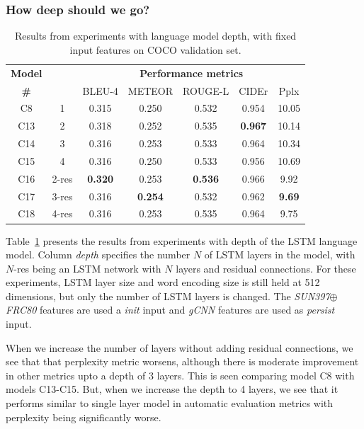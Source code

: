 \subsubsection{How deep should we go?}
\begin{table}[htp]
  \centering
  \newcommand{\bs}{\small}
  \begin{adjustbox}{center}
  \begin{tabular}{|c|c|c|c|c|c|c|}
    \hline
    \bf Model & \bf \multirow{2}{*}{Depth} & \multicolumn{5}{c|}{\bf Performance metrics}\\
    \cline{3-7}
    \bf \# &\bf &\bs BLEU-4 &\bs METEOR &\bs ROUGE-L &\bs CIDEr&\bs Pplx \\\hline
    C8  & 1   & 0.315 & 0.250 & 0.532 & 0.954 &10.05  \\\hline
    C13 & 2   & 0.318 & 0.252 & 0.535 &\bf0.967 & 10.14  \\
    C14 & 3   & 0.316 & 0.253 & 0.533 & 0.964   & 10.34  \\
    C15 & 4   & 0.316 & 0.250 & 0.533 & 0.956 & 10.69  \\\hline
    C16 &2-res&\bf0.320& 0.253 &\bf0.536&0.966  & 9.92   \\
    C17 &3-res& 0.316 &\bf0.254&0.532 & 0.962   &\bf9.69 \\
    C18 &4-res& 0.316 & 0.253 & 0.535 & 0.964   & 9.75 \\\hline
  \end{tabular}
  \end{adjustbox}
  \caption{Results from experiments with language model depth, with fixed input features on COCO validation set.}
  \label{tab:resCocDepthExpt}
\end{table}

Table~\ref{tab:resCocDepthExpt} presents the results from experiments with depth
of the LSTM language model.
Column \emph{depth} specifies the number $N$ of LSTM layers in the model,
with $N$-res being an LSTM network with $N$ layers and residual connections.
For these experiments, LSTM layer size and word encoding size is still held at
512 dimensions, but only the number of LSTM layers is changed.
The \emph{SUN397$\oplus$FRC80} features are used a \emph{init} input and
\emph{gCNN} features are used as \emph{persist} input.

When we increase the number of layers without adding residual connections, we
see that that perplexity metric worsens, although there is moderate improvement
in other metrics upto a depth of 3 layers.
This is seen comparing model C8 with models C13-C15.
But, when we increase the depth to 4 layers, we see that it performs similar to
single layer model in automatic evaluation metrics with perplexity being
significantly worse.

